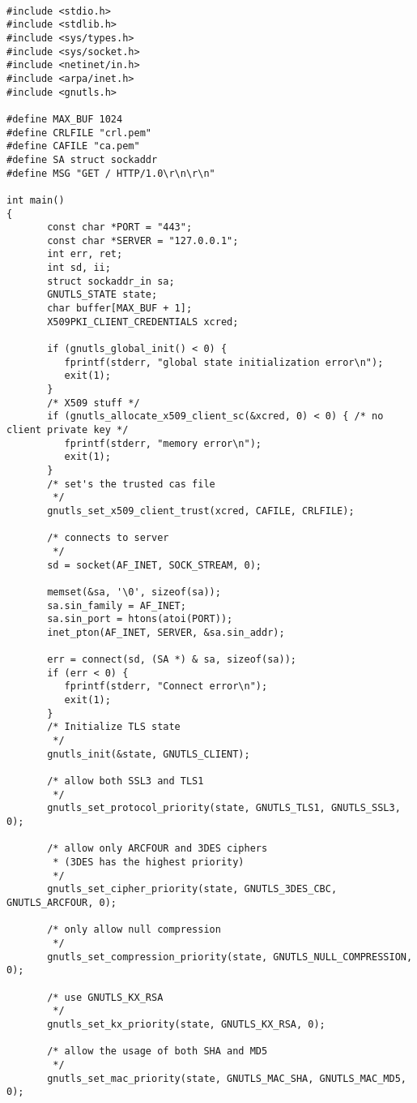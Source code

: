 \begin{verbatim}

#include <stdio.h>
#include <stdlib.h>
#include <sys/types.h>
#include <sys/socket.h>
#include <netinet/in.h>
#include <arpa/inet.h>
#include <gnutls.h>

#define MAX_BUF 1024
#define CRLFILE "crl.pem"
#define CAFILE "ca.pem"
#define SA struct sockaddr
#define MSG "GET / HTTP/1.0\r\n\r\n"

int main()
{
       const char *PORT = "443";
       const char *SERVER = "127.0.0.1";
       int err, ret;
       int sd, ii;
       struct sockaddr_in sa;
       GNUTLS_STATE state;
       char buffer[MAX_BUF + 1];
       X509PKI_CLIENT_CREDENTIALS xcred;

       if (gnutls_global_init() < 0) {
	      fprintf(stderr, "global state initialization error\n");
	      exit(1);
       }
       /* X509 stuff */
       if (gnutls_allocate_x509_client_sc(&xcred, 0) < 0) {	/* no client private key */
	      fprintf(stderr, "memory error\n");
	      exit(1);
       }
       /* set's the trusted cas file
        */
       gnutls_set_x509_client_trust(xcred, CAFILE, CRLFILE);

       /* connects to server 
        */
       sd = socket(AF_INET, SOCK_STREAM, 0);

       memset(&sa, '\0', sizeof(sa));
       sa.sin_family = AF_INET;
       sa.sin_port = htons(atoi(PORT));
       inet_pton(AF_INET, SERVER, &sa.sin_addr);

       err = connect(sd, (SA *) & sa, sizeof(sa));
       if (err < 0) {
	      fprintf(stderr, "Connect error\n");
	      exit(1);
       }
       /* Initialize TLS state 
        */
       gnutls_init(&state, GNUTLS_CLIENT);

       /* allow both SSL3 and TLS1
        */
       gnutls_set_protocol_priority(state, GNUTLS_TLS1, GNUTLS_SSL3, 0);

       /* allow only ARCFOUR and 3DES ciphers
        * (3DES has the highest priority)
        */
       gnutls_set_cipher_priority(state, GNUTLS_3DES_CBC, GNUTLS_ARCFOUR, 0);

       /* only allow null compression
        */
       gnutls_set_compression_priority(state, GNUTLS_NULL_COMPRESSION, 0);

       /* use GNUTLS_KX_RSA
        */
       gnutls_set_kx_priority(state, GNUTLS_KX_RSA, 0);

       /* allow the usage of both SHA and MD5
        */
       gnutls_set_mac_priority(state, GNUTLS_MAC_SHA, GNUTLS_MAC_MD5, 0);



\end{verbatim}
